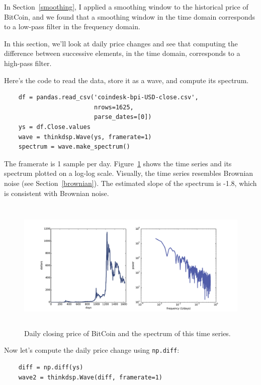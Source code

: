 \documentclass[12pt]{book}
\begin{document}
In Section~\ref{smoothing}, I applied a smoothing window to
the historical price of BitCoin, and we found that a smoothing
window in the time domain corresponds to a low-pass filter in
the frequency domain.

In this section, we'll look at daily price changes and
see that computing the difference between successive elements,
in the time domain, corresponds to a high-pass filter.

Here's the code to read the data, store it as a wave, and compute its
spectrum.

\begin{verbatim}
    df = pandas.read_csv('coindesk-bpi-USD-close.csv', 
                         nrows=1625, 
                         parse_dates=[0])
    ys = df.Close.values
    wave = thinkdsp.Wave(ys, framerate=1)
    spectrum = wave.make_spectrum()
\end{verbatim}

The framerate is 1 sample per day.  Figure~\ref{fig.diff_int1} shows
the time series and its spectrum plotted on a log-log scale.
Visually, the time series resembles Brownian noise (see
Section~\ref{brownian}).  The estimated slope of the spectrum is -1.8,
which is consistent with Brownian noise.

\begin{figure}
\centerline{\includegraphics[height=2.5in]{figs/systems1.pdf}}
\caption{Daily closing price of BitCoin and the spectrum of this time
  series.}
\label{fig.diff_int1}
\end{figure}

Now let's compute the daily price change using {\tt np.diff}:

\begin{verbatim}
    diff = np.diff(ys)
    wave2 = thinkdsp.Wave(diff, framerate=1)
\end{verbatim}
\end{document}
